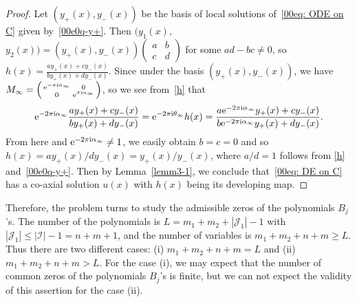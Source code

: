 \documentclass[10pt,a4paper]{amsart}
\numberwithin{equation}{section}
\def\SM#1#2#3#4{\left(\begin{smallmatrix}#1&#2\\#3&#4\end{smallmatrix}
 \right)}
\begin{document}
\begin{proof}
Let $(y_+(x), y_-(x))$ be the basis of local solutions of~\eqref{00eq: ODE on C} given by~\eqref{00e0q-y+}. Then $(y_1(x),$ $y_2(x))=(y_+(x), y_-(x))\SM{a}{b}{c}{d}$ for some $ad-bc\neq 0$, so $h(x)=\frac{ay_+(x)+cy_-(x)}{by_+(x)+dy_-(x)}$. Since under the basis $(y_{+}(x), y_{-}(x))$, we have $M_{\infty}=\SM{{\rm e}^{-\pi {\rm i} \alpha_\infty}}{0}{0}{{\rm e}^{\pi {\rm i} \alpha_\infty}}$, so we see from~\eqref{h} that
\[{\rm e}^{-2\pi {\rm i}
 \alpha_{\infty}}\frac{ay_+(x)+cy_-(x)}{by_+(x)+dy_-(x)}={\rm e}^{-2\pi {\rm i}
 \theta_{\infty}}h(x)=\frac{a{\rm e}^{-2\pi {\rm i}
 \alpha_{\infty}}y_+(x)+cy_-(x)}{b{\rm e}^{-2\pi {\rm i}
 \alpha_{\infty}}y_+(x)+dy_-(x)}.\] From here and ${\rm e}^{-2\pi {\rm i}
 \alpha_{\infty}}\neq 1$, we easily obtain $b=c=0$ and so
$h(x)=ay_+(x)/dy_-(x)=y_+(x)/y_-(x)$, where $a/d=1$ follows from
\eqref{h} and~\eqref{00e0q-y+}. Then by Lemma~\ref{lemm3-1}, we
conclude that~\eqref{00eq: DE on C} has a co-axial solution $u(x)$
with $h(x)$ being its developing map.
\end{proof}

Therefore, the problem turns to study the admissible zeros of the
polynomials $B_j$'s. The number of the polynomials is
$L=m_1+m_2+|\mathcal{J}_1|-1$ with $|\mathcal{J}_1|\leq
|\mathcal{I}|-1=n+m+1$, and the number of variables is
$m_1+m_2+n+m\geq L$. Thus there are two different cases: (i)
$m_1+m_2+n+m=L$ and (ii) $m_1+m_2+n+m>L$. For the case (i), we may
expect that the number of common zeros of the polynomials $B_j$'s is
finite, but we can not expect the validity of this assertion for the
case (ii).
\end{document}

